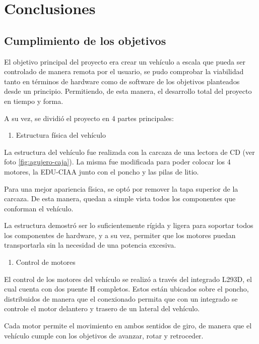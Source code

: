 \chapter{Conclusiones}

\section{Cumplimiento de los objetivos}

El objetivo principal del proyecto era crear un vehículo a escala que
pueda ser controlado de manera remota por el usuario, se pudo comprobar
la viabilidad tanto en términos de hardware como de software de los
objetivos planteados desde un principio. Permitiendo, de esta manera, el
desarrollo total del proyecto en tiempo y forma.

A su vez, se dividió el proyecto en 4 partes principales:

\begin{enumerate}
\def\labelenumi{\arabic{enumi}.}
\tightlist
\item
  Estructura física del vehículo
\end{enumerate}

La estructura del vehículo fue realizada con la carcaza de una lectora
de CD (ver foto \ref{fig:agujero-caja}). La misma fue modificada para poder colocar los 4 motores, la
EDU-CIAA junto con el poncho y las pilas de litio.

Para una mejor apariencia física, se optó por remover la tapa superior
de la carcaza. De esta manera, quedan a simple vista todos los
componentes que conforman el vehículo.

La estructura demostró ser lo suficientemente rígida y ligera para
soportar todos los componentes de hardware, y a su vez, permiter que los
motores puedan transportarla sin la necesidad de una potencia excesiva.

\begin{enumerate}
\def\labelenumi{\arabic{enumi}.}
\setcounter{enumi}{1}
\tightlist
\item
  Control de motores
\end{enumerate}

El control de los motores del vehículo se realizó a través del integrado
L293D, el cual cuenta con dos puente H completos. Estos están ubicados
sobre el poncho, distribuidos de manera que el conexionado permita que
con un integrado se controle el motor delantero y trasero de un lateral
del vehículo.

Cada motor permite el movimiento en ambos sentidos de giro, de manera
que el vehículo cumple con los objetivos de avanzar, rotar y retroceder.

